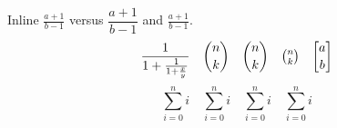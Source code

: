 \documentclass{article}
\begin{document}
Inline $\frac{a+1}{b-1}$ versus $\dfrac{a+1}{b-1}$ and $\tfrac{a+1}{b-1}$.
\[\frac{1}{1+\frac{1}{1+\frac{x}{y}}}\quad\binom{n}{k}\quad\dbinom{n}{k}\quad\tbinom{n}{k}\quad\genfrac{[}{]}{0pt}{}{a}{b}\]
\[\displaystyle\sum_{i=0}^n i\quad\textstyle\sum_{i=0}^n i\quad\scriptstyle\sum_{i=0}^n i\quad\scriptscriptstyle\sum_{i=0}^n i\]
\end{document}
